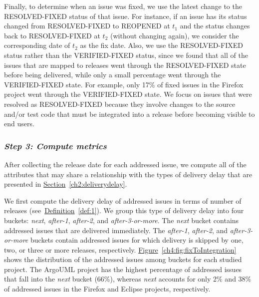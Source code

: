 Finally, to determine when an issue was fixed, we use the latest change to the
RESOLVED-FIXED status of that issue.  For instance, if an issue has its status
changed from RESOLVED-FIXED to REOPENED at $t_1$ and the status changes back to
RESOLVED-FIXED at $t_2$ (without changing again), we consider the corresponding
date of $t_2$ as the fix date. Also, we use the RESOLVED-FIXED status rather
than the VERIFIED-FIXED status, since we found that all of the issues that are
mapped to releases went through the RESOLVED-FIXED state before being delivered, while
only a small percentage went through the VERIFIED-FIXED state. For example, only 17\% of
fixed issues in the Firefox project went through the VERIFIED-FIXED state.
We focus on issues that were resolved as RESOLVED-FIXED because they involve
changes to the source and/or test code that must be integrated into a release
before becoming visible to end users.

\subsubsection*{\textbf{\textit{Step 3: Compute metrics}}} \label{settings:step3}

After collecting the release date for each addressed issue, we compute all of the
attributes that may share a relationship with the types of delivery delay that
are presented in
\hyperref[ch2:deliverydelay]{Section}~\ref{ch2:deliverydelay}.

We first compute the delivery delay of addressed issues in terms of number of
releases (see~\hyperref[def:1]{Definition}~\ref{def:1}). We group this type of
delivery delay into four buckets: \textit{next}, \textit{after-1},
\textit{after-2}, and \textit{after-3-or-more}. The \textit{next} bucket
contains addressed issues that are delivered immediately. The \textit{after-1},
\textit{after-2}, and \textit{after-3-or-more} buckets contain addressed issues
for which delivery is skipped by one, two, or three or more releases,
respectively.
\hyperref[ch4:fig:fixToIntegration]{Figure}~\ref{ch4:fig:fixToIntegration} shows
the distribution of the addressed issues among buckets for each studied project.
The ArgoUML project has the highest percentage of addressed issues that fall
into the \textit{next} bucket (66\%), whereas \textit{next} accounts for only
2\% and 38\% of addressed issues in the Firefox and Eclipse projects,
respectively. 

